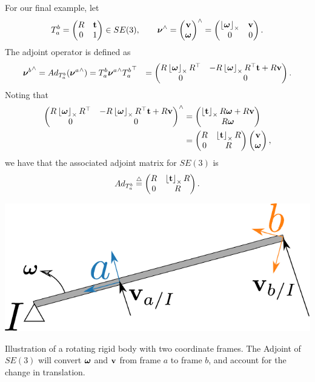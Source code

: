 For our final example, let 
\[
T_a^b = \begin{pmatrix} R & \mathbf{t} \\ 0 & 1\end{pmatrix} \in SE(3),  \qquad \boldsymbol{\nu}^\wedge = \begin{pmatrix} \mathbf{v} \\ \boldsymbol{\omega}\end{pmatrix}^\wedge = \begin{pmatrix} \left\lfloor\boldsymbol{\omega}\right\rfloor_{\times} & \mathbf{v} \\ 0 & 0 \end{pmatrix}.  
\]
The adjoint operator is defined as
\begin{align*}
{\boldsymbol{\nu}^b}^\wedge = Ad_{T_a^b}({\boldsymbol{\nu}^a}^\wedge) &= T_a^b {\boldsymbol{\nu}^a}^\wedge {T_a^b}^\top 
	&= \begin{pmatrix} R\left\lfloor\boldsymbol{\omega}\right\rfloor_{\times}R^\top & -R\left\lfloor\boldsymbol{\omega}\right\rfloor_{\times}R^\top \mathbf{t} + R\mathbf{v} \\ 0 & 0 \end{pmatrix}.
\end{align*}
Noting that
\begin{align*}
	\begin{pmatrix} R\left\lfloor\boldsymbol{\omega}\right\rfloor_{\times}R^\top & -R\left\lfloor\boldsymbol{\omega}\right\rfloor_{\times}R^\top \mathbf{t} + R\mathbf{v} \\ 0 & 0 \end{pmatrix}^\wedge
	&= \begin{pmatrix} \left\lfloor\mathbf{t}\right\rfloor_{\times}R\boldsymbol{\omega} + R\mathbf{v} \\ R\boldsymbol{\omega} \end{pmatrix} \\
	&= \begin{pmatrix} R & \left\lfloor\mathbf{t}\right\rfloor_{\times} R \\ 0 & R \end{pmatrix}\begin{pmatrix}\mathbf{v} \\ \boldsymbol{\omega} \end{pmatrix}, 
\end{align*}
we have that the associated adjoint matrix for $SE(3)$ is
\[
Ad_{T_a^b} \stackrel{\triangle}{=} \begin{pmatrix} R & \left\lfloor\mathbf{t}\right\rfloor_{\times} R \\ 0 & R \end{pmatrix}.
\]

\begin{marginfigure}
\includegraphics[width=\linewidth]{chap2_preliminaries/figures/rotating_bar}
\caption{Illustration of a rotating rigid body with two coordinate frames.
The Adjoint of $SE(3)$ will convert $\boldsymbol{\omega}$
and $\mathbf{v}$ from frame $a$ to frame $b$, and account for the
change in translation. }
\label{fig:rotating_adjoint}
\end{marginfigure}

